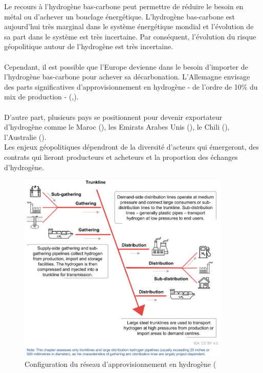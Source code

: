 Le recours à l'hydrogène bas-carbone peut permettre de réduire le besoin en métal ou d'achever un bouclage énergétique. L'hydrogène bas-carbone est aujourd'hui très marginal dans le système énergétique mondial et l'évolution de sa part dans le système est très incertaine. Par conséquent, l'évolution du risque géopolitique autour de l'hydrogène est très incertaine.\\
\\
Cependant, il est possible que l'Europe devienne dans le besoin d'importer de l'hydrogène bas-carbone pour achever sa décarbonation. L'Allemagne envisage des parts significatives d'approvisionnement en hydrogène - de l'ordre de 10\% du mix de production - (\cite{rte_futurs_2022},\cite{world_energy_council_importations_2021}).\\
\\
D'autre part, plusieurs pays se positionnent pour devenir exportateur d'hydrogène comme le Maroc (\cite{bloomberg_morocco_2022}), les Emirats Arabes Unis (\cite{bloomberg_masdar_2023}), le Chili (\cite{us_government_chile_2021}), l'Australie (\cite{australian_government_growing_2022}).\\
Les enjeux géopolitiques dépendront de la diversité d'acteurs qui émergeront, des contrats qui lieront producteurs et acheteurs et la proportion des échanges d'hydrogène.
\begin{figure}[!b]
    \centering
    \includegraphics[width=0.9\textwidth]{Images/hydrogene/hydrogen_supply.png}
    \caption{Configuration du réseau d'approvisionnement en hydrogène (\cite{iea_energy_2023}}
    \label{fig:hydrogen_supply}
\end{figure}